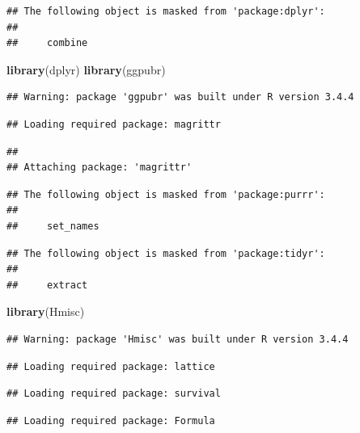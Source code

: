 \documentclass[]{article}
\newenvironment{Shaded}{\begin{snugshade}}{\end{snugshade}}
\newcommand{\KeywordTok}[1]{\textcolor[rgb]{0.13,0.29,0.53}{\textbf{#1}}}
\newcommand{\NormalTok}[1]{#1}
\begin{document}
\begin{verbatim}
## The following object is masked from 'package:dplyr':
## 
##     combine
\end{verbatim}

\begin{Shaded}
\begin{Highlighting}[]
\KeywordTok{library}\NormalTok{(dplyr)}
\KeywordTok{library}\NormalTok{(ggpubr)}
\end{Highlighting}
\end{Shaded}

\begin{verbatim}
## Warning: package 'ggpubr' was built under R version 3.4.4
\end{verbatim}

\begin{verbatim}
## Loading required package: magrittr
\end{verbatim}

\begin{verbatim}
## 
## Attaching package: 'magrittr'
\end{verbatim}

\begin{verbatim}
## The following object is masked from 'package:purrr':
## 
##     set_names
\end{verbatim}

\begin{verbatim}
## The following object is masked from 'package:tidyr':
## 
##     extract
\end{verbatim}

\begin{Shaded}
\begin{Highlighting}[]
\KeywordTok{library}\NormalTok{(Hmisc)}
\end{Highlighting}
\end{Shaded}

\begin{verbatim}
## Warning: package 'Hmisc' was built under R version 3.4.4
\end{verbatim}

\begin{verbatim}
## Loading required package: lattice
\end{verbatim}

\begin{verbatim}
## Loading required package: survival
\end{verbatim}

\begin{verbatim}
## Loading required package: Formula
\end{verbatim}
\end{document}
